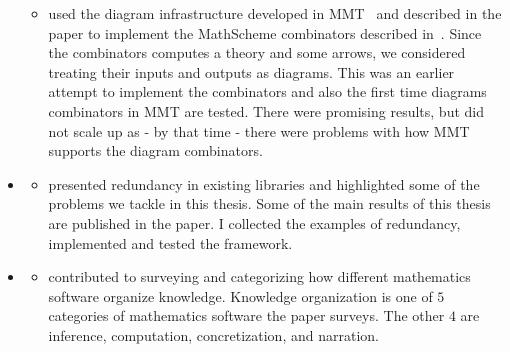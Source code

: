\begin{itemize}
    \begin{itemize}
    \item[] used the diagram infrastructure developed in MMT~\cite{rabe2013scalable} and described in the paper to implement the MathScheme combinators described in~\cite{carette2018building}. Since the combinators computes a theory and some arrows, we considered treating their inputs and outputs as diagrams.
This was an earlier attempt to implement the combinators and also the first time diagrams combinators in MMT are tested.  There were promising results, but did not scale up as - by that time - there were problems with how MMT supports the diagram combinators. 
    \end{itemize}        
    \item \cite{leverageCICM2020} 
    \begin{itemize}
    \item[]  presented redundancy in existing libraries and highlighted some of the problems we tackle in this thesis. Some of the main results of this thesis are published in the paper. I collected the examples of redundancy, implemented and tested the framework.
    \end{itemize} 
    \item \cite{bercic2020space} 
    \begin{itemize}
    \item[] contributed to surveying and categorizing how different mathematics software organize knowledge. Knowledge organization is one of $5$ categories of mathematics software the paper surveys. The other $4$ are inference, computation, concretization, and narration. 
    \end{itemize}        
\end{itemize}

